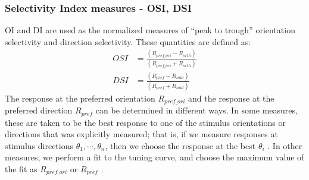 \documentclass[11pt]{article}
\begin{document}
\subsubsection{Selectivity Index measures - OSI, DSI} %
\label{ssub:traditional_selectivity_measures_oi_di_and_osi}
OI and DI are used as the normalized measures of ``peak to trough'' orientation selectivity and direction selectivity.
These quantities are defined as:
\begin{align}
    OSI &= \frac{(R_{pref\_ori} - R_{orth})}{(R_{pref\_ori} + R_{orth})}\\
    DSI &= \frac{(R_{pref} - R_{null})}{(R_{pref} + R_{null})}
\end{align}
The response at the preferred orientation $R_{pref\_ori}$ and the response at the preferred direction $R_{pref}$ can be determined in different ways. In some measures, these are taken to be the best response to one of the stimulus orientations or directions that was explicitly measured; that is, if we measure responses at stimulus directions $\theta_1, \cdots, \theta_n$, then we choose the response at the best $\theta_i$ . In other measures, we perform a fit to the tuning curve, and choose the maximum value of the fit as $R_{pref\_ori}$ or $R_{pref}$ .
\end{document}
